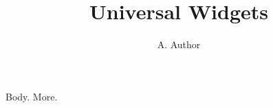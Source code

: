 \documentclass{article}
\title{Universal Widgets}
\author{A. Author}
\begin{document}
\maketitle
Body.
\maketitlesupplementary
More.
\end{document}
